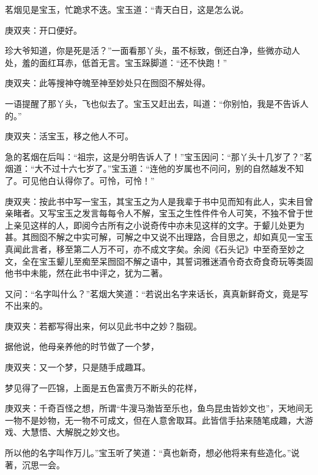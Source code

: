 \begin{parag}
    茗烟见是宝玉，忙跪求不迭。宝玉道：“青天白日，这是怎么说。\begin{note}庚双夹：开口便好。\end{note}珍大爷知道，你是死是活？”一面看那丫头，虽不标致，倒还白净，些微亦动人处，羞的面红耳赤，低首无言。宝玉跺脚道：“还不快跑！”\begin{note}庚双夹：此等搜神夺魄至神至妙处只在囫囵不解处得。\end{note}一语提醒了那丫头，飞也似去了。宝玉又赶出去，叫道：“你别怕，我是不告诉人的。”\begin{note}庚双夹：活宝玉，移之他人不可。\end{note}急的茗烟在后叫：“祖宗，这是分明告诉人了！”宝玉因问：“那丫头十几岁了？”茗烟道：“大不过十六七岁了。”宝玉道：“连他的岁属也不问问，别的自然越发不知了。可见他白认得你了。可怜，可怜！”\begin{note}庚双夹：按此书中写一宝玉，其宝玉之为人是我辈于书中见而知有此人，实未目曾亲睹者。又写宝玉之发言每每令人不解，宝玉之生性件件令人可笑，不独不曾于世上亲见这样的人，即阅今古所有之小说奇传中亦未见这样的文字。于颦儿处更为甚。其囫囵不解之中实可解，可解之中又说不出理路，合目思之，却如真见一宝玉真闻此言者，移至第二人万不可，亦不成文字矣。余阅《石头记》中至奇至妙之文，全在宝玉颦儿至痴至呆囫囵不解之语中，其誓词雅迷酒令奇衣奇食奇玩等类固他书中未能，然在此书中评之，犹为二著。\end{note}又问：“名字叫什么？”茗烟大笑道：“若说出名字来话长，真真新鲜奇文，竟是写不出来的。\begin{note}庚双夹：若都写得出来，何以见此书中之妙？脂砚。\end{note}据他说，他母亲养他的时节做了一个梦，\begin{note}庚双夹：又一个梦，只是随手成趣耳。\end{note}梦见得了一匹锦，上面是五色富贵万不断头的花样，\begin{note}庚双夹：千奇百怪之想，所谓“牛溲马渤皆至乐也，鱼鸟昆虫皆妙文也”，天地间无一物不是妙物，无一物不可成文，但在人意舍取耳。此皆信手拈来随笔成趣，大游戏、大慧悟、大解脱之妙文也。\end{note}所以他的名字叫作万儿。”宝玉听了笑道：“真也新奇，想必他将来有些造化。”说著，沉思一会。
\end{parag}


